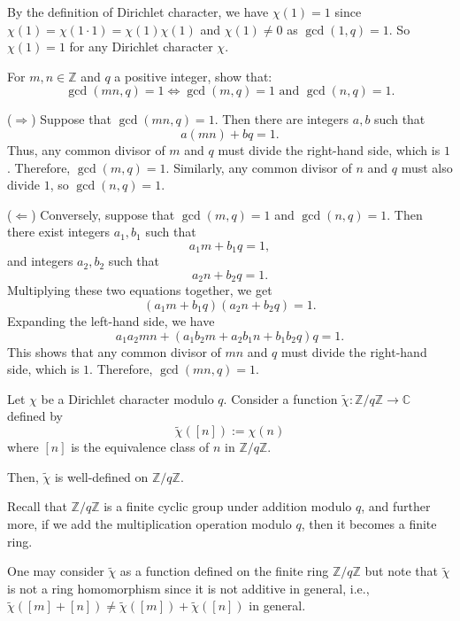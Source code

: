\documentclass{elegantbook}
\begin{document}
\begin{note}
  By the definition of Dirichlet character, we have $\chi(1)=1$ since $\chi(1)=\chi(1\cdot1)=\chi(1)\chi(1)$ and $\chi(1)\ne0$ as $\gcd(1,q)=1$. So $\chi(1)=1$ for any Dirichlet character $\chi$.
\end{note}

\begin{exercise}
  For $m,n\in \mathbb{Z}$ and $q$ a positive integer, show that:
  \[
    \gcd(mn,q)=1 \iff \gcd(m,q)=1 \text{ and } \gcd(n,q)=1.
  \]
\end{exercise}

\begin{solution}
  ($\Rightarrow$) Suppose that $\gcd(mn,q)=1$. Then there are integers $a,b$ such that
  \[
    a(mn) + bq = 1.
  \]
  Thus, any common divisor of $m$ and $q$ must divide the right-hand side, which is $1$. Therefore, $\gcd(m,q)=1$. Similarly, any common divisor of $n$ and $q$ must also divide $1$, so $\gcd(n,q)=1$.

  ($\Leftarrow$) Conversely, suppose that $\gcd(m,q)=1$ and $\gcd(n,q)=1$. Then there exist integers $a_1,b_1$ such that
  \[
    a_1 m + b_1 q = 1,
  \]
  and integers $a_2,b_2$ such that
  \[
    a_2 n + b_2 q = 1.
  \]
  Multiplying these two equations together, we get
  \[
    (a_1 m + b_1 q)(a_2 n + b_2 q) = 1.
  \]
  Expanding the left-hand side, we have
  \[
    a_1 a_2 mn + (a_1 b_2 m + a_2 b_1 n + b_1 b_2 q) q = 1.
  \]
  This shows that any common divisor of $mn$ and $q$ must divide the right-hand side, which is $1$. Therefore, $\gcd(mn,q)=1$.
\end{solution}

\begin{proposition} \label{prop:dirichlet_character_well_defined_on_Z_mod_qZ}
  Let $\chi$ be a Dirichlet character modulo $q$. Consider a function $\widetilde{\chi}:\mathbb{Z}/q\mathbb{Z}\to\mathbb{C}$ defined by
  \[
    \widetilde{\chi}([n]) := \chi(n)
  \]
  where $[n]$ is the equivalence class of $n$ in $\mathbb{Z}/q\mathbb{Z}$.

  Then, $\widetilde{\chi}$ is well-defined on $\mathbb{Z}/q\mathbb{Z}$.
\end{proposition}

\begin{remark}
  Recall that $\mathbb{Z}/q\mathbb{Z}$ is a finite cyclic group under addition modulo $q$, and further more, if we add the multiplication operation modulo $q$, then it becomes a finite ring.

  One may consider $\widetilde{\chi}$ as a function defined on the finite ring $\mathbb{Z}/q\mathbb{Z}$ but note that $\widetilde{\chi}$ is not a ring homomorphism since it is not additive in general, i.e., $\widetilde{\chi}([m]+[n]) \ne \widetilde{\chi}([m]) + \widetilde{\chi}([n])$ in general.
\end{remark}
\end{document}
